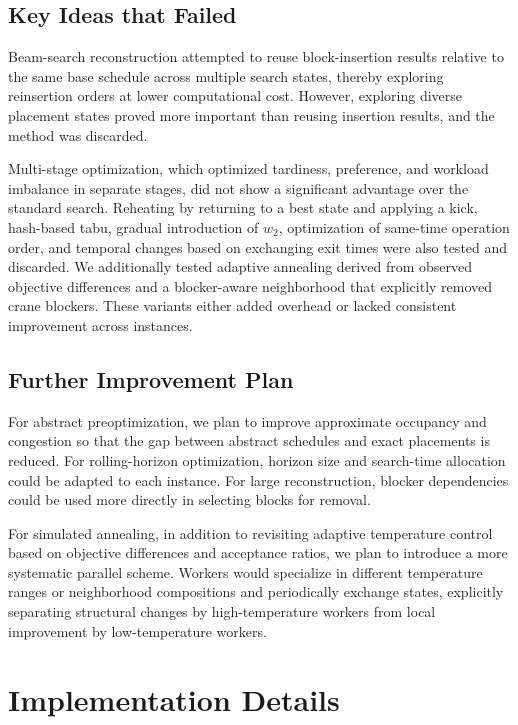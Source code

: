 \documentclass[runningheads]{llncs}
\begin{document}
\subsection{Key Ideas that Failed}

Beam-search reconstruction attempted to reuse block-insertion results relative to the same base schedule across multiple search states, thereby exploring reinsertion orders at lower computational cost. However, exploring diverse placement states proved more important than reusing insertion results, and the method was discarded.

Multi-stage optimization, which optimized tardiness, preference, and workload imbalance in separate stages, did not show a significant advantage over the standard search. Reheating by returning to a best state and applying a kick, hash-based tabu, gradual introduction of $w_2$, optimization of same-time operation order, and temporal changes based on exchanging exit times were also tested and discarded. We additionally tested adaptive annealing derived from observed objective differences and a blocker-aware neighborhood that explicitly removed crane blockers. These variants either added overhead or lacked consistent improvement across instances.

\subsection{Further Improvement Plan}

For abstract preoptimization, we plan to improve approximate occupancy and congestion so that the gap between abstract schedules and exact placements is reduced. For rolling-horizon optimization, horizon size and search-time allocation could be adapted to each instance. For large reconstruction, blocker dependencies could be used more directly in selecting blocks for removal.

For simulated annealing, in addition to revisiting adaptive temperature control based on objective differences and acceptance ratios, we plan to introduce a more systematic parallel scheme. Workers would specialize in different temperature ranges or neighborhood compositions and periodically exchange states, explicitly separating structural changes by high-temperature workers from local improvement by low-temperature workers.

\section{Implementation Details}
\label{sec:implementation}
\end{document}
